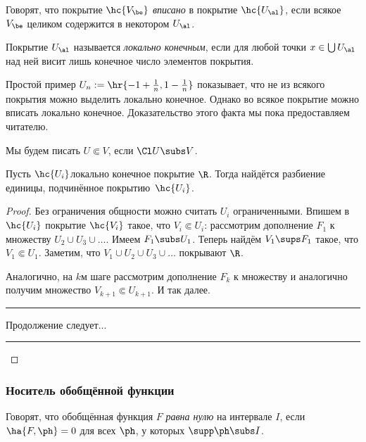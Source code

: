 \documentclass[a4paper]{article}
\newenvironment{petit}
{\par \smallskip \hrule \smallskip \footnotesize}
{\par \smallskip \hrule \smallskip}
\begin{document}
\begin{df}
Говорят, что покрытие $\hc{V_\be}$ \emph{вписано} в покрытие $\hc{U_\al}$, если всякое $V_\be$ целиком
содержится в некотором $U_\al$.
\end{df}

\begin{df}
Покрытие $U_\al$ называется \emph{локально конечным}, если для любой точки $x \in \bigcup U_\al$ над ней
висит лишь конечное число элементов покрытия.
\end{df}

Простой пример $U_n := \hr{-1 + \frac1n,1 - \frac1n}$ показывает, что не из всякого покрытия
можно выделить локально конечное. Однако во всякое покрытие можно вписать локально конечное.
Доказательство этого факта мы пока предоставляем читателю.

Мы будем писать $U \Subset V$, если $\Cl U \subs V$.

\begin{stm}
Пусть $\hc{U_i}$\т локально конечное покрытие $\R$. Тогда найдётся разбиение единицы,
подчинённое покрытию~$\hc{U_i}$.
\end{stm}
\begin{proof}
Без ограничения общности можно считать $U_i$ ограниченными.
Впишем в $\hc{U_i}$ покрытие $\hc{V_i}$ такое, что $V_i \Subset U_i$: рассмотрим дополнение $F_1$
к множеству $U_2\cup U_3\cup\dots$. Имеем $F_1 \subs U_1$. Теперь найдём $V_1 \sups F_1$ такое,
что $V_1 \Subset U_1$. Заметим, что $V_1 \cup U_2 \cup U_3 \cup\dots$ покрывают $\R$.

Аналогично, на $k$\д м шаге рассмотрим дополнение $F_k$ к множеству
и аналогично получим множество $V_{k+1} \Subset U_{k+1}$. И так далее.

\begin{petit}
Продолжение следует...
\end{petit}
\end{proof}



\subsubsection{Носитель обобщённой функции}

\begin{df}
Говорят, что обобщённая функция $F$ \emph{равна нулю} на интервале $I$, если $\ha{F,\ph} = 0$ для всех $\ph$,
у которых $\supp \ph \subs I$.
\end{df}
\end{document}
